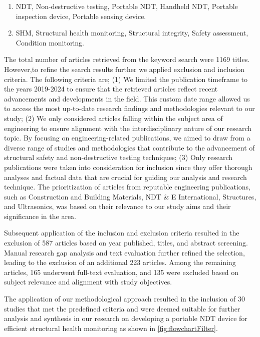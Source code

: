 \documentclass[journal, a4paper]{IEEEtran}
\begin{document}
\begin{enumerate}[label={Keyword Set \arabic*:}, leftmargin=*]
  \item NDT, Non-destructive testing, Portable NDT, Handheld NDT, Portable inspection device, Portable sensing device.
  \item SHM, Structural health monitoring, Structural integrity, Safety assessment, Condition monitoring.
\end{enumerate}

The total number of articles retrieved from the keyword search were 1169 titles.
However,to refine the search results further we applied exclusion and inclusion criteria.
The following criteria are;
(1) We limited the publication timeframe to the years 2019-2024 to ensure that the retrieved
articles reflect recent advancements and developments in the field.
This custom date range allowed us to access the most up-to-date research findings and methodologies relevant to our study;
(2) We only considered articles falling within the subject area of engineering to
ensure alignment with the interdisciplinary nature of our research topic.
By focusing on engineering-related publications, we aimed to draw from a diverse range of
studies and methodologies that contribute to the advancement of structural safety and non-destructive testing techniques;
(3) Only research publications were taken into consideration for inclusion since they offer thorough analyses and factual
data that are crucial for guiding our analysis and research technique.
The prioritization of articles from reputable engineering publications, such as Construction and Building Materials,
NDT \& E International, Structures, and Ultrasonics, was based on their relevance to our study aims and their
significance in the area.

Subsequent application of the inclusion and exclusion criteria resulted in the exclusion of 587 articles based on year published,
titles, and abstract screening. Manual research gap analysis and text evaluation further refined the selection,
leading to the exclusion of an additional 223 articles. Among the remaining articles, 165 underwent full-text evaluation,
and 135 were excluded based on subject relevance and alignment with study objectives.

The application of our methodological approach resulted in the inclusion of 30 studies that met the predefined
criteria and were deemed suitable for further analysis and synthesis in our research on developing a portable
NDT device for efficient structural health monitoring as shown in \autoref{fig:flowchartFilter}.
\end{document}
